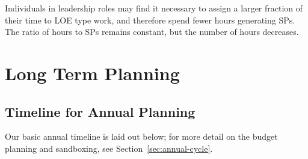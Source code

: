 Individuals in leadership roles may find it necessary to assign a larger fraction of their time to \gls{LOE} type work, and therefore spend fewer hours generating \glspl{SP}.
The ratio of hours to \glspl{SP} remains constant, but the number of hours decreases.

\section{Long Term Planning}
\label{sec:long-term-plan}

\subsection{Timeline for Annual Planning}
\label{sec:annual-planning-timeline}

Our basic annual timeline is laid out below; for more detail on the budget planning and sandboxing, see Section~\ref{sec:annual-cycle}.

